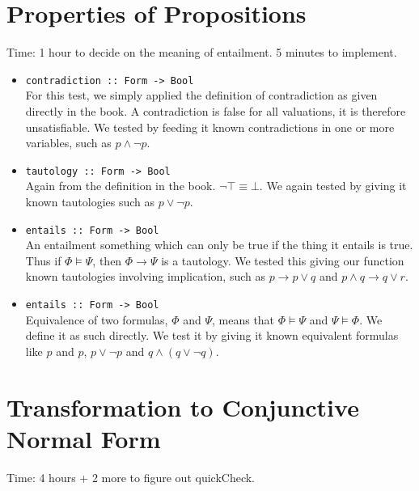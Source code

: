 \documentclass[11pt,a4paper]{article}
\numberwithin{equation}{section}%
\begin{document}
\section{Properties of Propositions}
Time: 1 hour to decide on the meaning of entailment. 5 minutes to implement.
\begin{itemize}
    \item \texttt{contradiction :: Form -> Bool} \\
        For this test, we simply applied the definition of contradiction as given directly in the book. A contradiction is false for all valuations, it is therefore unsatisfiable. We tested by feeding it known contradictions in one or more variables, such as $p \wedge \neg p$.
    \item \texttt{tautology :: Form -> Bool} \\
        Again from the definition in the book. $\neg \top \equiv \bot$. We again tested by giving it known tautologies such as $p \vee \neg p$.
    \item \texttt{entails :: Form -> Bool} \\
        An entailment something which can only be true if the thing it entails is true. Thus if $\Phi \models \Psi$, then $\Phi \rightarrow \Psi$ is a tautology. We tested this giving our function known tautologies involving implication, such as $p \rightarrow p \vee q$ and $p \wedge q \rightarrow q \vee r$.
    \item \texttt{entails :: Form -> Bool} \\ 
        Equivalence of two formulas, $\Phi$ and $\Psi$, means that $\Phi \models \Psi$ and $\Psi \models \Phi$. We define it as such directly. We test it by giving it known equivalent formulas like $p$ and $p$, $p \vee \neg p$ and $q \wedge (q \vee \neg q)$.
\end{itemize}


\section{Transformation to Conjunctive Normal Form}
Time: 4 hours + 2 more to figure out quickCheck.
\end{document}
